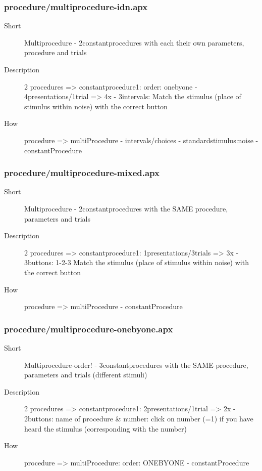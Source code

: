 \subsubsection{procedure/multiprocedure-idn.apx}
\begin{description}
\item[Short] 
 Multiprocedure - 2constantprocedures with each their own parameters, procedure and trials
\item[Description] 
 2 procedures =\textgreater{} constantprocedure1: order: onebyone - 4presentations/1trial =\textgreater{} 4x - 3intervals: Match the stimulus (place of stimulus within noise) with the correct button
\item[How] 
 procedure =\textgreater{} multiProcedure - intervals/choices - standardstimulus:noise - constantProcedure
\end{description}

\subsubsection{procedure/multiprocedure-mixed.apx}
\begin{description}
\item[Short] 
 Multiprocedure - 2constantprocedures with the SAME procedure, parameters and trials
\item[Description] 
 2 procedures =\textgreater{} constantprocedure1: 1presentations/3trials =\textgreater{} 3x - 3buttons: 1-2-3 Match the stimulus (place of stimulus within noise) with the correct button
\item[How] 
 procedure =\textgreater{} multiProcedure - constantProcedure
\end{description}

\subsubsection{procedure/multiprocedure-onebyone.apx}
\begin{description}
\item[Short] 
 Multiprocedure-order! - 3constantprocedures with the SAME procedure, parameters and trials (different stimuli)
\item[Description] 
 2 procedures =\textgreater{} constantprocedure1: 2presentations/1trial =\textgreater{} 2x - 2buttons: name of procedure \& number: click on number (=1) if you have heard the stimulus (corresponding with the number)
\item[How] 
 procedure =\textgreater{} multiProcedure: order: ONEBYONE - constantProcedure
\end{description}

